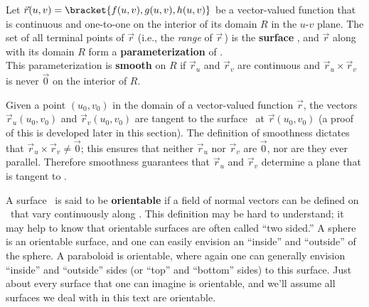 
\begin{definition}\label{def:parameterized_surface}%
Let $\vec r(u,v) = \bracket{f(u,v),g(u,v),h(u,v)}$ be a vector-valued function that is continuous and one-to-one on the interior of its domain $R$ in the $u$-$v$ plane. The set of all terminal points of $\vec r$ (i.e., the \emph{range} of $\vec r$\,) is the \textbf{surface} \surfaceS, and $\vec r$ along with its domain $R$ form a \textbf{parameterization} of \surfaceS.\bigskip\\
This parameterization is \textbf{smooth} on $R$ if $\vec r_u$ and $\vec r_v$ are continuous and $\vec r_u\times \vec r_v$ is never $\vec 0$ on the interior of $R$.
\end{definition}

Given a point $(u_0,v_0)$ in the domain of a vector-valued function $\vec r$, the vectors $\vec r_u(u_0,v_0)$ and $\vec r_v(u_0,v_0)$ are tangent to the surface \surfaceS\ at $\vec r(u_0,v_0)$ (a proof of this is developed later in this section). The definition of smoothness dictates that $\vec r_u\times \vec r_v \neq \vec 0$; this ensures that neither $\vec r_u$ nor $\vec r_v$ are $\vec 0$, nor are they ever parallel. Therefore smoothness guarantees that $\vec r_u$ and $\vec r_v$ determine a plane that is tangent to \surfaceS.


A surface \surfaceS\ is said to be \textbf{orientable} if a field of normal vectors can be defined on \surfaceS\ that vary continuously along \surfaceS. This definition may be hard to understand; it may help to know that orientable surfaces are often called ``two sided.'' A sphere is an orientable surface, and one can easily envision an ``inside'' and ``outside'' of the sphere. A paraboloid is orientable, where again one can generally envision  ``inside'' and ``outside'' sides (or ``top'' and ``bottom'' sides) to this surface. Just about every surface that one can imagine is orientable, and we'll assume all surfaces we deal with in this text are orientable.

